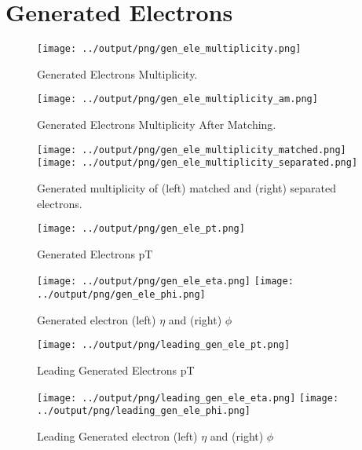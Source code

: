 \documentclass[11pt]{book}
\begin{document}
\section{Generated Electrons}

\begin{figure}[htb]
\centering
\texttt{[image: ../output/png/gen\_ele\_multiplicity.png]}
\caption{Generated Electrons Multiplicity.}
\label{fig:gen_ele_multiplicity}
\end{figure}

\begin{figure}[htb]
\centering
\texttt{[image: ../output/png/gen\_ele\_multiplicity\_am.png]}
\caption{Generated Electrons Multiplicity After Matching.}
\label{fig:gen_ele_multiplicity_am}
\end{figure}


\begin{figure}[htb]
\centering
\texttt{[image: ../output/png/gen\_ele\_multiplicity\_matched.png]}
\texttt{[image: ../output/png/gen\_ele\_multiplicity\_separated.png]}
\caption{Generated multiplicity of (left) matched and (right) separated electrons.}
\label{fig:gn_ele_mat_sep}
\end{figure}

\begin{figure}[htb]
\centering
\texttt{[image: ../output/png/gen\_ele\_pt.png]}
\caption{Generated Electrons pT}
\label{fig:gen_ele_pt}
\end{figure}
\clearpage

\begin{figure}[htb]
\centering
\texttt{[image: ../output/png/gen\_ele\_eta.png]}
\texttt{[image: ../output/png/gen\_ele\_phi.png]}
\caption{Generated electron (left) $\eta$ and (right) $\phi$}
\label{fig:gen_ele_eta_phi}
\end{figure}

\begin{figure}[htb]
\centering
\texttt{[image: ../output/png/leading\_gen\_ele\_pt.png]}
\caption{Leading Generated Electrons pT}
\label{fig:leading_gen_ele_pt}
\end{figure}

\begin{figure}[htb]
\centering
\texttt{[image: ../output/png/leading\_gen\_ele\_eta.png]}
\texttt{[image: ../output/png/leading\_gen\_ele\_phi.png]}
\caption{Leading Generated electron (left) $\eta$ and (right) $\phi$}
\label{fig:leading_gen_ele_eta_phi}
\end{figure}
\clearpage
\end{document}
